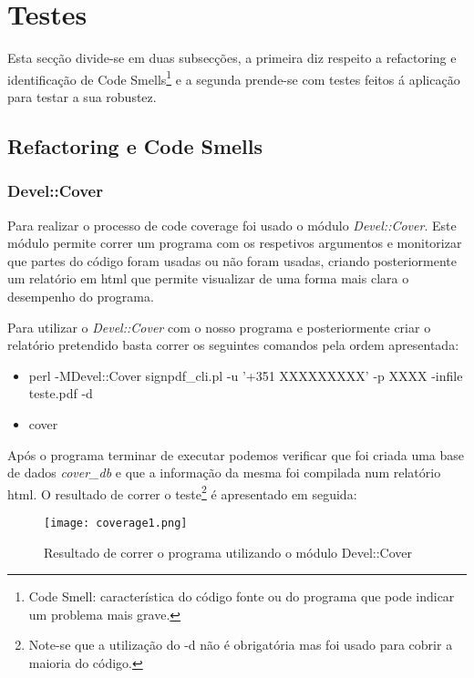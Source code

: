 \section{Testes}
\label{sec:Testes}

\par Esta secção divide-se em duas subsecções, a primeira diz respeito a refactoring e identificação de Code Smells\footnote{Code Smell: característica do código fonte ou do programa que pode indicar um problema mais grave.}\cite{codeSmells1,codeSmells2} e a segunda prende-se com testes feitos á aplicação para testar a sua robustez.

\subsection{Refactoring e Code Smells}


\subsubsection{Devel::Cover}
\hfill\newline

\par Para realizar o processo de code coverage foi usado o módulo \textit{Devel::Cover}\cite{develCover}. Este módulo permite correr um programa com os respetivos argumentos e monitorizar que partes do código foram usadas ou não foram usadas, criando posteriormente um relatório em html que permite visualizar de uma forma mais clara o desempenho do programa.
\par Para utilizar o \textit{Devel::Cover} com o nosso programa e posteriormente criar o relatório pretendido basta correr os seguintes comandos pela ordem apresentada:
\begin{itemize}
	\item perl -MDevel::Cover signpdf\_cli.pl -u '+351 XXXXXXXXX' -p XXXX -infile teste.pdf -d
	\item cover
\end{itemize}

Após o programa terminar de executar podemos verificar que foi criada uma base de dados \textit{cover\_db} e que a informação da mesma foi compilada num relatório html.
O resultado de correr o teste\footnote{Note-se que a utilização do -d não é obrigatória mas foi usado para cobrir a maioria do código.} é apresentado em seguida:

\begin{figure}[H]

  \centering
  \captionsetup{justification=centering}

  \texttt{[image: coverage1.png]}
  
  \caption {Resultado de correr o programa utilizando o módulo Devel::Cover}

  \label{fig:coverage1}
\end{figure}


